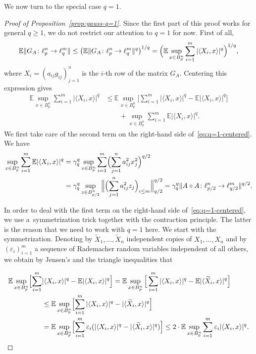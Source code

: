 \documentclass[a4paper]{amsart}
\theoremstyle{definition}
\theoremstyle{remark}
\numberwithin{equation}{section}
\newcommand*{\EE}{\mathbb{E}}
\newcommand*{\hadprod}{\mathbin{\circ}} %
\begin{document}
We now turn to the special case $q=1$.

\begin{proof}[Proof of Proposition~\ref{prop:gauss-q=1}]
	Since the first part of this proof works for general $q\geq 1$,
	we do not restrict our attention to $q=1$ for now.
First of all,
\[
\EE \| G_A \colon \ell_{p}^n \to\ell_q^m \| \leq \bigl(\EE \| G_A \colon \ell_{p}^n \to\ell_q^m \|^q\bigr)^{1/q}
= \Bigl( \EE \sup_{x\in B_{p}^n} \sum_{i=1}^m |\langle X_i,x \rangle|^q\Bigr)^{1/q},
\]
where $X_i=(a_{ij}g_{ij})_{j=1}^n$ is the $i$-th row of the matrix $G_A$. Centering this expression gives
\begin{align}
\label{eq:q=1-centered}
	\EE \sup_{x\in B_{p}^n} \sum_{i=1}^m |\langle X_i,x \rangle|^q
	&\leq \EE \sup_{x\in B_{p}^n} \Big[\sum_{i=1}^m |\langle X_i,x \rangle|^q - \EE|\langle X_i,x \rangle|^q \Big]\\
	& \qquad + \sup_{x\in B_{p}^n} \sum_{i=1}^m \EE |\langle X_i, x \rangle|^q. \nonumber
\end{align}
We first take care of the second term on the right-hand side of~\eqref{eq:q=1-centered}.
We have
\begin{align}
  \label{eq:q=1-first-term}	\nonumber
	\sup_{x\in B_{p}^n} \sum_{i=1}^m \EE |\langle X_i, x \rangle|^q & =  \gamma_q^q \sup_{x\in B_{p}^n} \sum_{i=1}^m \Bigl(\sum_{j=1}^na_{ij}^2x_j^2\Bigr)^{q/2} \\
	& = \gamma_q^q  \sup_{z\in B_{p/2}^n} \Big\|\Bigl(\sum_{j=1}^na_{ij}^2z_j\Bigr)_{i\le m} \Big\|_{q/2}^{q/2}
	 = \gamma_q^q  \|A\hadprod A \colon \ell^n_{p/2} \to \ell^m_{q/2}\|^{q/2}.
\end{align}

In order to deal with the first term on the right-hand side of~\eqref{eq:q=1-centered},
we use a~symmetrization trick together with the contraction principle.
The latter is the reason that we need to work with $q=1$ here. We start with the symmetrization. Denoting by $\widetilde{X}_1,\dots,\widetilde{X}_n$ independent copies of $X_1, \dots, X_n$ and by $(\varepsilon_i)_{i=1}^m$ a sequence of Rademacher random variables independent of all others, we obtain by Jensen's and the triangle inequalities that

\begin{align}
	\EE \sup_{x\in B_{p}^n}   \Bigl[\sum_{i=1}^m & |\langle X_i,x \rangle|^q - \EE|\langle X_i,x \rangle|^q \Bigr]
	 = \EE \sup_{x\in B_{p}^n} \Big[\sum_{i=1}^m |\langle X_i,x \rangle|^q - \EE|\langle \widetilde{X}_i,x \rangle|^q \Bigr]\nonumber\\
	& \leq \EE \sup_{x\in B_{p}^n} \Bigl[\sum_{i=1}^m |\langle X_i,x \rangle|^q - |\langle \widetilde{X}_i,x \rangle|^q \Bigr] \nonumber\\
	&	 = \EE \sup_{x\in B_{p}^n} \Bigl[\sum_{i=1}^m \varepsilon_i( |\langle X_i,x \rangle|^q - |\langle \widetilde{X}_i,x \rangle|^q) \Bigr]
	 \leq 2 \cdot  \EE \sup_{x\in B_{p}^n} \sum_{i=1}^m \varepsilon_i |\langle X_i,x \rangle|^q.\label{eq:q=1-second-term-a-sym}
\end{align}


\end{proof}
\end{document}
